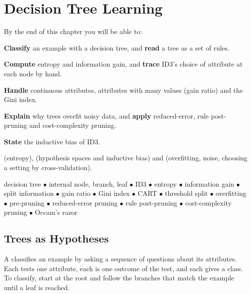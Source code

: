 \chapter{Decision Tree Learning}\label{ch:trees}

\begin{outcomes}
By the end of this chapter you will be able to:
\begin{tight}
  \item \textbf{Classify} an example with a decision tree, and \textbf{read} a
        tree as a set of rules.
  \item \textbf{Compute} entropy and information gain, and \textbf{trace} ID3's
        choice of attribute at each node by hand.
  \item \textbf{Handle} continuous attributes, attributes with many values
        (gain ratio) and the Gini index.
  \item \textbf{Explain} why trees overfit noisy data, and \textbf{apply}
        reduced-error, rule post-pruning and cost-complexity pruning.
  \item \textbf{State} the inductive bias of ID3.
\end{tight}
\end{outcomes}

\begin{prereq}
 (entropy),  (hypothesis spaces and inductive bias)
and  (overfitting, noise, choosing a setting by
cross-validation).
\end{prereq}

\begin{keyterms}
decision tree $\bullet$ internal node, branch, leaf $\bullet$ ID3 $\bullet$
entropy $\bullet$ information gain $\bullet$ split information $\bullet$ gain
ratio $\bullet$ Gini index $\bullet$ CART $\bullet$ threshold split $\bullet$
overfitting $\bullet$ pre-pruning $\bullet$ reduced-error pruning $\bullet$ rule
post-pruning $\bullet$ cost-complexity pruning $\bullet$ Occam's razor
\end{keyterms}

\section{Trees as Hypotheses}

A  classifies an example by asking a sequence of questions
about its attributes. Each  tests one attribute, each
 is one outcome of the test, and each  gives a class.
To classify, start at the root and follow the branches that match the example
until a leaf is reached.

